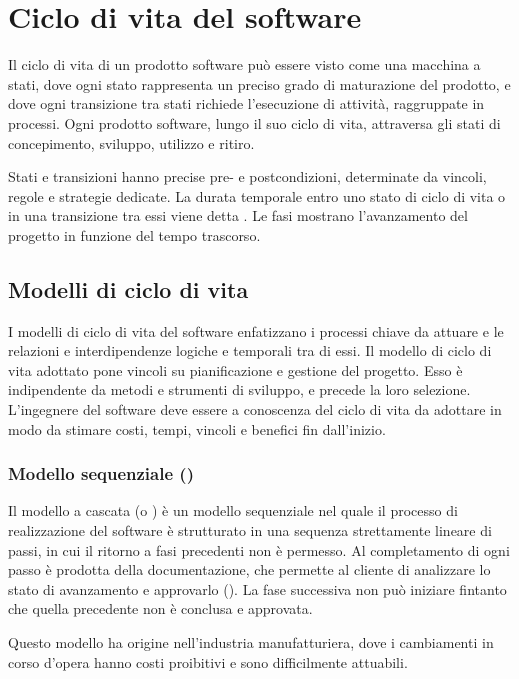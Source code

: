 \section{Ciclo di vita del software}

Il ciclo di vita di un prodotto software può essere visto come una macchina a
stati, dove ogni stato rappresenta un preciso grado di maturazione del prodotto,
e dove ogni transizione tra stati richiede l'esecuzione di attività, raggruppate
in processi. Ogni prodotto software, lungo il suo ciclo di vita, attraversa gli
stati di concepimento, sviluppo, utilizzo e ritiro.

Stati e transizioni hanno precise pre- e postcondizioni, determinate da vincoli,
regole e strategie dedicate. La durata temporale entro uno stato di ciclo di
vita o in una transizione tra essi viene detta . Le fasi mostrano
l'avanzamento del progetto in funzione del tempo trascorso.

\subsection{Modelli di ciclo di vita}

I modelli di ciclo di vita del software enfatizzano i processi chiave da attuare
e le relazioni e interdipendenze logiche e temporali tra di essi. Il modello di
ciclo di vita adottato pone vincoli su pianificazione e gestione del progetto.
Esso è indipendente da metodi e strumenti di sviluppo, e precede la loro
selezione. L'ingegnere del software deve essere a conoscenza del ciclo di vita
da adottare in modo da stimare costi, tempi, vincoli e benefici fin dall'inizio.

\subsubsection{Modello sequenziale ()}

Il modello a cascata (o ) è un modello sequenziale nel
quale il processo di realizzazione del software è strutturato in una sequenza
strettamente lineare di passi, in cui il ritorno a fasi precedenti non è
permesso. Al completamento di ogni passo è prodotta della documentazione, che
permette al cliente di analizzare lo stato di avanzamento e approvarlo
(). La fase successiva non può iniziare fintanto
che quella precedente non è conclusa e approvata.

Questo modello ha origine nell'industria manufatturiera, dove i cambiamenti in
corso d'opera hanno costi proibitivi e sono difficilmente attuabili.

